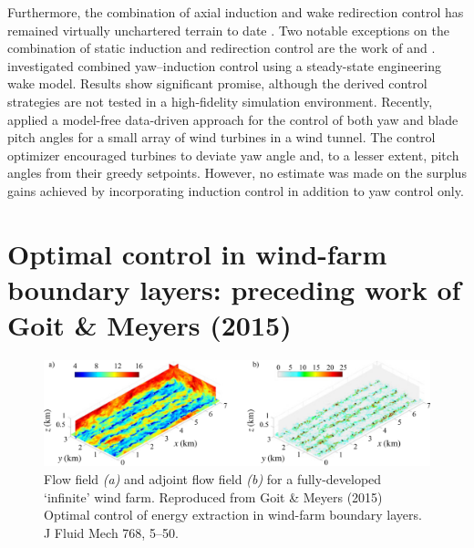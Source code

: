 Furthermore, the combination of axial induction and wake redirection control has remained virtually unchartered terrain to date \citep{boersma2017tutorial}. Two notable exceptions on the combination of static induction and redirection control are the work of \cite{park2015cooperative} and \cite{park2017data}. \cite{park2015cooperative} investigated combined yaw--induction control using a steady-state engineering wake model. Results show significant promise, although the derived control strategies are not tested in a high-fidelity simulation environment. Recently, \cite{park2017data} applied a model-free data-driven approach for the control of both yaw and blade pitch angles for a small array of wind turbines in a wind tunnel. The control optimizer encouraged turbines to deviate yaw angle and, to a lesser extent, pitch angles from their greedy setpoints. However, no estimate was made on the surplus gains achieved by incorporating induction control in addition to yaw control only. 

\section{Optimal control in wind-farm boundary layers: preceding work of Goit \& Meyers (2015)}\label{sec:goitmeyersjfm}

\begin{figure}
	\includegraphics[width=\textwidth]{chapters/introduction/forward_adjoint4.eps}
	\caption[Flow field and adjoint flow field for a fully-developed `infinite' wind farm.]{Flow field \emph{(a)} and adjoint flow field \emph{(b)} for a fully-developed `infinite' wind farm. Reproduced from Goit \& Meyers (2015) Optimal control of energy extraction in wind-farm boundary layers. J Fluid Mech 768, 5--50. \label{fig:flowfield_intro}}
\end{figure}

